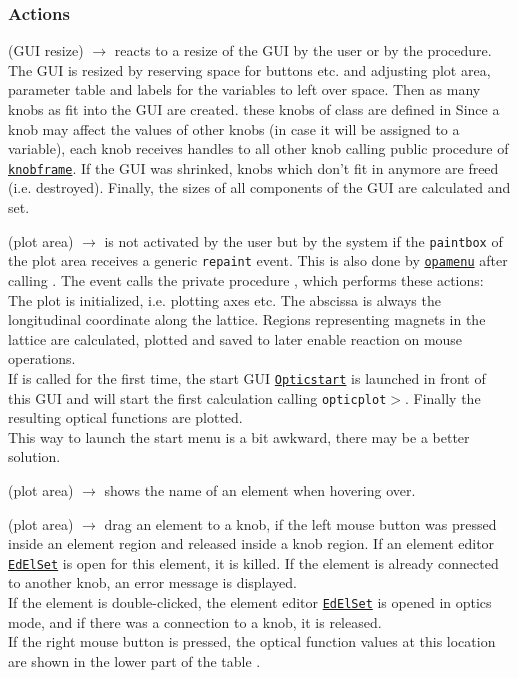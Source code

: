 \documentclass[12pt]{article}
\newcommand\code[1]{{\tt #1}}
\newcommand{\ofldx}[1]{\colorbox{black!15}{(#1)}}
\newcommand\guico[1]{{\color{blue}\code{#1}}}
\newcommand\guifco[1]{{\color{violet}\code{#1}}}
\newcommand{\unico}[1]{{\color{burntorange}\code{#1}}}
\newcommand{\evcodx}[2]{\ofldx{#1} $\rightarrow$ \guico{#2}}
\newcommand{\prcod}[2]{\opauni{#1}$>$\unico{#2}}
\newcommand{\opagui}[1]{\colorbox{blue!20}{\code{#1}}}
\newcommand{\ogui}[1]{\hyperref[#1]{\opagui{#1}}}
\newcommand{\opaguif}[1]{\colorbox{violet!30}{\code{#1}}}
\newcommand{\oguif}[1]{\hyperref[#1]{\opaguif{#1}}}
\newcommand{\opauni}[1]{\colorbox{orange!30}{\code{#1}}}
\newcommand{\act}[1]{\subsubsection*{Actions} #1}
\newcommand{\todo}[1]{{\color{red} #1}}
\begin{document}
\act{
\evcodx{GUI resize}{FormResize} reacts to a resize of the GUI by the user or by the \guico{Init} procedure. The GUI is resized by reserving space for buttons etc. and adjusting plot area, parameter table and labels for the variables to left over space.
Then as many knobs as fit into the GUI are created. these knobs of class 
\guifco{TKnob} are defined in   Since a knob may affect the values of other knobs (in case it will be assigned to a variable), each knob receives handles to all other knob calling public procedure \guifco{BrotherHandles} of \oguif{knobframe}. If the GUI was shrinked, knobs which don't fit in anymore are freed (i.e. destroyed). Finally, the sizes of all components of the GUI are calculated and set.

\evcodx{plot area}{pwpaint} is not activated by the user but by the system if the \code{paintbox} of the plot area receives a generic \code{repaint} event. This is also done by \ogui{opamenu} after calling \guico{Init}. The event calls the private procedure \guico{MakePlot}, which performs these actions:\\
The plot is initialized, i.e. plotting axes etc. The abscissa is always the longitudinal coordinate along the lattice. Regions representing magnets in the lattice are calculated, plotted and saved to later enable reaction on mouse operations.\\
If \guico{MakePlot} is called for the first time, the start GUI \ogui{Opticstart} is launched in front of this GUI and will start the first calculation calling \prcod{opticplot}{OpticCalc}. Finally the resulting optical functions are plotted.\\ \todo{This way to launch the start menu is a bit awkward, there may be a better solution.}

\evcodx{plot area}{pwMouseMove} shows the name of an element when hovering over.

\evcodx{plot area}{pwMouseDown, pwMouseUp} drag an element to a knob, if the left mouse button was pressed inside an element region and released inside a knob region. If an element editor \ogui{EdElSet} is open for this element, it is killed. If the element is already connected to another knob, an error message is displayed.\\
If the element is double-clicked, the element editor \ogui{EdElSet} is opened in optics mode, and if there was a connection to a knob, it is released.\\
If the right mouse button is pressed, the optical function values at this location are shown in the lower part of the table \guico{tab}.

}
\end{document}
